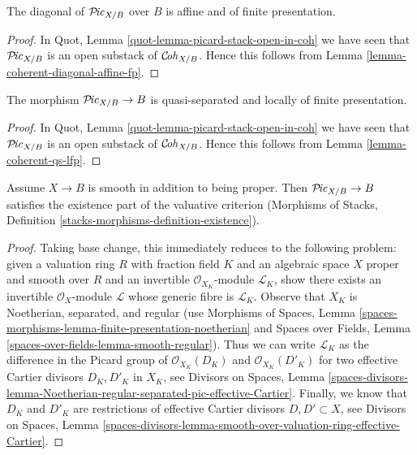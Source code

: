 \begin{lemma}
\label{lemma-pic-diagonal-affine-fp}
The diagonal of $\mathcal{P}\!\mathit{ic}_{X/B}$ over $B$ is affine
and of finite presentation.
\end{lemma}

\begin{proof}
In Quot, Lemma \ref{quot-lemma-picard-stack-open-in-coh} we have seen that
$\mathcal{P}\!\mathit{ic}_{X/B}$ is an open substack of
$\mathcal{C}\!\mathit{oh}_{X/B}$. Hence this follows from
Lemma \ref{lemma-coherent-diagonal-affine-fp}.
\end{proof}

\begin{lemma}
\label{lemma-pic-qs-lfp}
The morphism $\mathcal{P}\!\mathit{ic}_{X/B} \to B$ is quasi-separated and
locally of finite presentation.
\end{lemma}

\begin{proof}
In Quot, Lemma \ref{quot-lemma-picard-stack-open-in-coh} we have seen that
$\mathcal{P}\!\mathit{ic}_{X/B}$ is an open substack of
$\mathcal{C}\!\mathit{oh}_{X/B}$. Hence this follows from
Lemma \ref{lemma-coherent-qs-lfp}.
\end{proof}

\begin{lemma}
\label{lemma-pic-existence-part}
Assume $X \to B$ is smooth in addition to being proper.
Then $\mathcal{P}\!\mathit{ic}_{X/B} \to B$ satisfies the existence part
of the valuative criterion (Morphisms of Stacks, Definition
\ref{stacks-morphisms-definition-existence}).
\end{lemma}

\begin{proof}
Taking base change, this immediately reduces to the following
problem: given a valuation ring $R$ with fraction field $K$ and
an algebraic space $X$ proper and smooth over $R$ and an invertible
$\mathcal{O}_{X_K}$-module $\mathcal{L}_K$, show there exists
an invertible $\mathcal{O}_X$-module $\mathcal{L}$
whose generic fibre is $\mathcal{L}_K$.
Observe that $X_K$ is Noetherian, separated, and regular
(use Morphisms of Spaces, Lemma
\ref{spaces-morphisms-lemma-finite-presentation-noetherian}
and
Spaces over Fields, Lemma \ref{spaces-over-fields-lemma-smooth-regular}).
Thus we can write
$\mathcal{L}_K$ as the difference in the Picard group of
$\mathcal{O}_{X_K}(D_K)$ and $\mathcal{O}_{X_K}(D'_K)$
for two effective Cartier divisors $D_K, D'_K$ in $X_K$, see
Divisors on Spaces, Lemma
\ref{spaces-divisors-lemma-Noetherian-regular-separated-pic-effective-Cartier}.
Finally, we know that $D_K$ and $D'_K$ are restrictions of
effective Cartier divisors $D, D' \subset X$, see
Divisors on Spaces, Lemma
\ref{spaces-divisors-lemma-smooth-over-valuation-ring-effective-Cartier}.
\end{proof}

